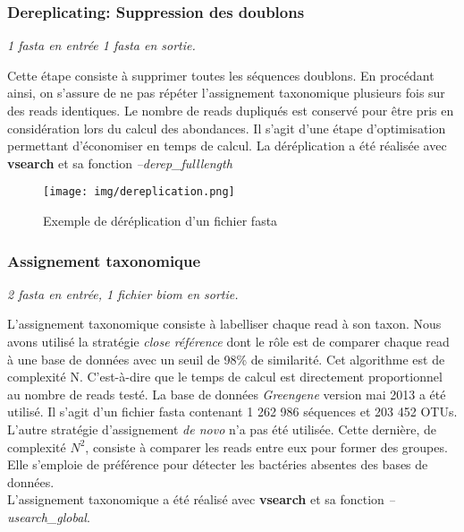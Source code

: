 \documentclass[12pt,a4paper]{article}
\begin{document}
\subsubsection{Dereplicating: Suppression des doublons}
\noindent\emph{1 fasta en entrée 1 fasta en sortie. }

Cette étape consiste à supprimer toutes les séquences doublons. En procédant ainsi, on s'assure de ne pas répéter l'assignement taxonomique plusieurs fois sur des reads identiques. Le nombre de reads dupliqués est conservé pour être pris en considération lors du calcul des abondances. Il s'agit d'une étape d'optimisation permettant d'économiser en temps de calcul. La déréplication a été réalisée avec \textbf{vsearch}\cite{TorbjornRognes2015} et sa fonction \textit{--derep\_fulllength }

\begin{figure}[ht]
\begin{center}
\texttt{[image: img/dereplication.png]}\hfill
\end{center}
\caption{Exemple de déréplication d'un fichier fasta}
\label{dereplication}
\end{figure}

\subsubsection{Assignement taxonomique}
\noindent\emph{2 fasta en entrée,  1 fichier biom  en sortie. }

L’assignement taxonomique consiste à labelliser chaque read à son taxon. Nous avons utilisé la stratégie \textit{close référence} dont le rôle est de comparer chaque read à une base de données avec un seuil de 98\% de similarité. Cet algorithme est de complexité N. C'est-à-dire que le temps de calcul est directement proportionnel au nombre de reads testé. La base de données \textit{Greengene}\cite{DeSantis2006} version mai 2013  a été utilisé. Il s'agit d'un fichier fasta contenant 1 262 986 séquences et 203 452 OTUs. \\
L'autre stratégie d'assignement \textit{de novo} n'a pas été utilisée. Cette dernière, de complexité $N^{2}$, consiste à comparer les reads entre eux pour former des groupes. Elle s'emploie de préférence pour détecter les bactéries absentes des bases de données. \\
L'assignement taxonomique a été réalisé avec \textbf{vsearch} et sa fonction \textit{--usearch\_global}.
\end{document}
